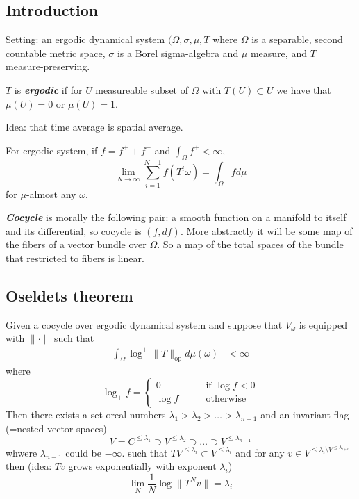 \subsection{Introduction}

Setting: an ergodic dynamical system \((\Omega,\sigma,\mu,T\) where \(\Omega\) is a separable, second countable metric space, \(\sigma\) is a Borel sigma-algebra and \(\mu\) measure, and \(T\) measure-preserving.

\begin{defn}\leavevmode
\(T\) is \textit{\textbf{ergodic}} if for \(U\) measureable subset of  \(\Omega\) with \(T(U) \subset U\) we have that \(\mu(U) =0\) or \(\mu(U)=1\).
\end{defn}

\begin{thm}\leavevmode
Idea: that time average is spatial average.

For ergodic system, if \(f=f^+ + f^-\) and \(\int_\Omega f^+ < \infty\),
\[\lim_{N \to \infty} \sum_{i=1}^{N-1}f(T^i \omega)=\int_\Omega fd\mu\]
for  \(\mu\)-almost any \(\omega\).
\end{thm}

\begin{defn}\leavevmode
\textit{\textbf{Cocycle}} is morally the following pair: a smooth function on a manifold to itself and its differential, so cocycle is \((f,df)\). More abstractly it will be some map of the fibers of a vector bundle over \(\Omega\). So a map of the total spaces of the bundle that restricted to fibers is linear.
\end{defn}

\subsection{Oseldets theorem}

\begin{thm}\leavevmode
Given a cocycle over ergodic dynamical system and suppose that \(V_\omega\) is equipped with \(\|\cdot \|\) such that
\begin{align*}
\int_\Omega \operatorname{log}^+ \|T\|_{\operatorname{o p}}d\mu(\omega)&< \infty
\end{align*}
where
\[\operatorname{log}_+f=\begin{cases}
	0\qquad &\text{if \(\operatorname{log}f<0\)}  \\
	\operatorname{log}f\qquad &\text{otherwise} 
\end{cases}\]
Then there exists a set oreal numbers \(\lambda_1>\lambda_2>\ldots>\lambda_{n-1}\) and an invariant flag (=nested vector spaces)
 \[V=C^{\leq  \lambda_1}\supset V^{\leq  \lambda_2}\supset \ldots\supset V^{\leq  \lambda_{n-1}}\]
 whwere \(\lambda_{n-1}\) could be \(-\infty\). such that \(TV^{\leq \lambda_i}\subset V^{\leq  \lambda_i}\) and for any  \(v \in V^{\leq  \lambda_i \setminus V^{\leq \lambda_{i+i}}}\)then (idea: \(Tv\) grows exponentially with exponent \(\lambda_i\))
 \[\lim_{N} \frac{1}{N}\operatorname{log} \| T^Nv\|=\lambda_i\]
\end{thm}

